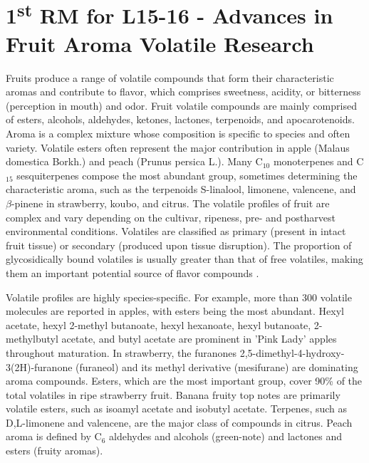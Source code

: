 \section{\texorpdfstring{1\textsuperscript{st} RM for L15-16 - Advances in Fruit Aroma Volatile Research}{1st RM for L15-16 - Advances in Fruit Aroma Volatile Research}}

Fruits produce a range of volatile compounds that form their characteristic aromas and contribute to flavor, which comprises sweetness, acidity, or bitterness (perception in mouth) and odor. Fruit volatile compounds are mainly comprised of esters, alcohols, aldehydes, ketones, lactones, terpenoids, and apocarotenoids. Aroma is a complex mixture whose composition is specific to species and often variety. Volatile esters often represent the major contribution in apple (Malaus domestica Borkh.) and peach (Prunus persica L.). Many C$_{10}$ monoterpenes and C$_{15}$ sesquiterpenes compose the most abundant group, sometimes determining the characteristic aroma, such as the terpenoids S-linalool, limonene, valencene, and $\beta$-pinene in strawberry, koubo, and citrus. The volatile profiles of fruit are complex and vary depending on the cultivar, ripeness, pre- and postharvest environmental conditions. Volatiles are classified as primary (present in intact fruit tissue) or secondary (produced upon tissue disruption). The proportion of glycosidically bound volatiles is usually greater than that of free volatiles, making them an important potential source of flavor compounds \cite*{rm_09.1_L15_16_fruit_aroma_volatile_research}.

\vspace{0.5em}
Volatile profiles are highly species-specific. For example, more than 300 volatile molecules are reported in apples, with esters being the most abundant. Hexyl acetate, hexyl 2-methyl butanoate, hexyl hexanoate, hexyl butanoate, 2-methylbutyl acetate, and butyl acetate are prominent in 'Pink Lady' apples throughout maturation. In strawberry, the furanones 2,5-dimethyl-4-hydroxy-3(2H)-furanone (furaneol) and its methyl derivative (mesifurane) are dominating aroma compounds. Esters, which are the most important group, cover 90\% of the total volatiles in ripe strawberry fruit. Banana fruity top notes are primarily volatile esters, such as isoamyl acetate and isobutyl acetate. Terpenes, such as D,L-limonene and valencene, are the major class of compounds in citrus. Peach aroma is defined by C$_6$ aldehydes and alcohols (green-note) and lactones and esters (fruity aromas).

